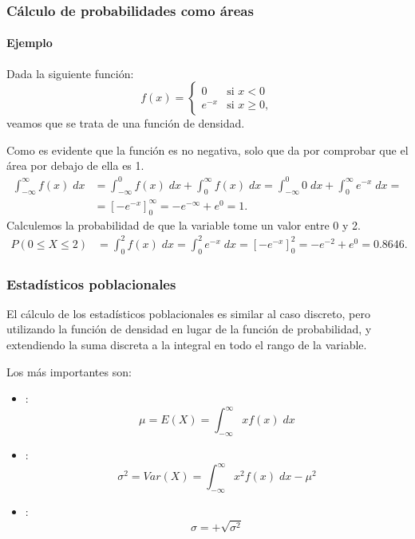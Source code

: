 \begin{frame}
\frametitle{Cálculo de probabilidades como áreas}
\framesubtitle{Ejemplo}
Dada la siguiente función:
\[
f(x) = 
\begin{cases}
0 & \mbox{si $x<0$}\\
e^{-x} & \mbox{si $x\geq 0$},
\end{cases}
\]
veamos que se trata de una función de densidad. 

Como es evidente que la función es no negativa, solo que da por comprobar que el área por debajo de ella es 1.
\begin{align*}
\int_{-\infty}^\infty f(x)\;dx &= \int_{-\infty}^0 f(x)\;dx +\int_0^\infty f(x)\;dx = \int_{-\infty}^0 0\;dx +\int_0^\infty e^{-x}\;dx =\\
&= \left[-e^{-x}\right]_0^{\infty} = -e^{-\infty}+e^0 = 1.
\end{align*}
Calculemos la probabilidad de que la variable tome un valor entre 0 y 2.
\begin{align*}
P(0\leq X\leq 2) &= \int_0^2 f(x)\;dx = \int_0^2 e^{-x}\;dx = \left[-e^{-x}\right]_0^2 = -e^{-2}+e^0 = 0.8646. 
\end{align*}

\end{frame}


\begin{frame}
\frametitle{Estadísticos poblacionales}
El cálculo de los estadísticos poblacionales es similar al caso discreto, pero utilizando la función de densidad en lugar de la función de
probabilidad, y extendiendo la suma discreta a la integral en todo el rango de la variable.

Los más importantes son:
\begin{itemize}
\item {}:
\[
\mu = E(X) = \int_{-\infty}^\infty x f(x)\; dx
\]
\item {}:
\[
\sigma^2 = Var(X) = \int_{-\infty}^\infty x^2f(x)\; dx -\mu^2
\]
\item {}:
\[
\sigma = +\sqrt{\sigma^2}
\] 
\end{itemize}

\end{frame}


